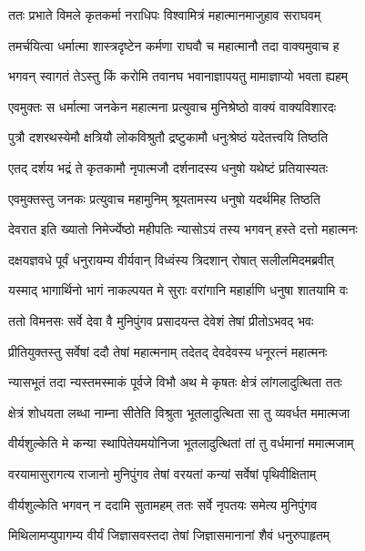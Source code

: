 
\twolineshloka
{ततः प्रभाते विमले कृतकर्मा नराधिपः}
{विश्वामित्रं महात्मानमाजुहाव सराघवम्} %

\twolineshloka
{तमर्चयित्वा धर्मात्मा शास्त्रदृष्टेन कर्मणा}
{राघवौ च महात्मानौ तदा वाक्यमुवाच ह} %

\twolineshloka
{भगवन् स्वागतं तेऽस्तु किं करोमि तवानघ}
{भवानाज्ञापयतु मामाज्ञाप्यो भवता ह्यहम्} %

\twolineshloka
{एवमुक्तः स धर्मात्मा जनकेन महात्मना}
{प्रत्युवाच मुनिश्रेष्ठो वाक्यं वाक्यविशारदः} %

\twolineshloka
{पुत्रौ दशरथस्येमौ क्षत्रियौ लोकविश्रुतौ}
{द्रष्टुकामौ धनुःश्रेष्ठं यदेतत्त्वयि तिष्ठति} %

\twolineshloka
{एतद् दर्शय भद्रं ते कृतकामौ नृपात्मजौ}
{दर्शनादस्य धनुषो यथेष्टं प्रतियास्यतः} %

\twolineshloka
{एवमुक्तस्तु जनकः प्रत्युवाच महामुनिम्}
{श्रूयतामस्य धनुषो यदर्थमिह तिष्ठति} %

\twolineshloka
{देवरात इति ख्यातो निमेर्ज्येष्ठो महीपतिः}
{न्यासोऽयं तस्य भगवन् हस्ते दत्तो महात्मनः} %

\twolineshloka
{दक्षयज्ञवधे पूर्वं धनुरायम्य वीर्यवान्}
{विध्वंस्य त्रिदशान् रोषात् सलीलमिदमब्रवीत्} %

\twolineshloka
{यस्माद् भागार्थिनो भागं नाकल्पयत मे सुराः}
{वरांगानि महार्हाणि धनुषा शातयामि वः} %

\twolineshloka
{ततो विमनसः सर्वे देवा वै मुनिपुंगव}
{प्रसादयन्त देवेशं तेषां प्रीतोऽभवद् भवः} %

\twolineshloka
{प्रीतियुक्तस्तु सर्वेषां ददौ तेषां महात्मनाम्}
{तदेतद् देवदेवस्य धनूरत्नं महात्मनः} %

\twolineshloka
{न्यासभूतं तदा न्यस्तमस्माकं पूर्वजे विभौ}
{अथ मे कृषतः क्षेत्रं लांगलादुत्थिता ततः} %

\twolineshloka
{क्षेत्रं शोधयता लब्धा नाम्ना सीतेति विश्रुता}
{भूतलादुत्थिता सा तु व्यवर्धत ममात्मजा} %

\twolineshloka
{वीर्यशुल्केति मे कन्या स्थापितेयमयोनिजा}
{भूतलादुत्थितां तां तु वर्धमानां ममात्मजाम्} %

\twolineshloka
{वरयामासुरागत्य राजानो मुनिपुंगव}
{तेषां वरयतां कन्यां सर्वेषां पृथिवीक्षिताम्} %

\twolineshloka
{वीर्यशुल्केति भगवन् न ददामि सुतामहम्}
{ततः सर्वे नृपतयः समेत्य मुनिपुंगव} %

\twolineshloka
{मिथिलामप्युपागम्य वीर्यं जिज्ञासवस्तदा}
{तेषां जिज्ञासमानानां शैवं धनुरुपाहृतम्} %


